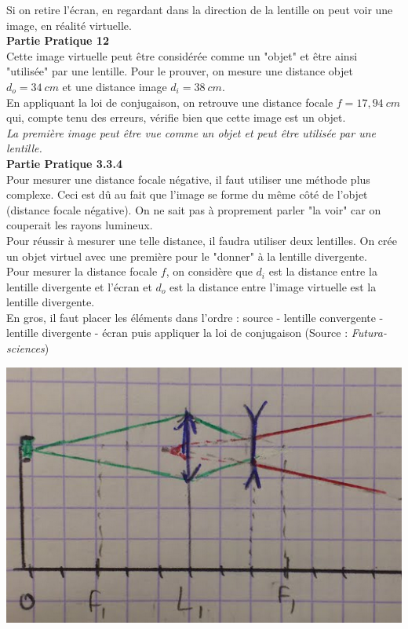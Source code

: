 \documentclass	[11pt, a4paper, openany]{book}
\begin{document}
		Si on retire l'écran, en regardant dans la direction de la lentille on peut voir une image, en réalité virtuelle.\\
		
		\textbf{Partie Pratique 12}\\
		Cette image virtuelle peut être considérée comme un "objet" et être ainsi "utilisée" par une lentille. Pour le prouver, on mesure une distance objet $d_o = 34\ cm$ et une distance image $d_i = 38\ cm$.\\
		En appliquant la loi de conjugaison, on retrouve une distance focale $f = 17,94\ cm$ qui, compte tenu des erreurs, vérifie bien que cette image est un objet.\\
		\textit{La première image peut être vue comme un objet et peut être utilisée  par une lentille.}\\
		
		\textbf{Partie Pratique 3.3.4}\\
		Pour mesurer une distance focale négative, il faut utiliser une méthode plus complexe. Ceci est dû au fait que l'image se forme du même côté de l'objet (distance focale négative). On ne sait pas à proprement parler "la voir" car on couperait les rayons lumineux.\\
		Pour réussir à mesurer une telle distance, il faudra utiliser deux lentilles. On crée un objet virtuel avec une première pour le "donner" à la lentille divergente.\\
		
		Pour mesurer la distance focale $f$, on considère que $d_i$ est la distance entre la lentille divergente et l'écran et $d_o$ est la distance entre  l'image virtuelle est la lentille divergente.\\
		
		En gros, il faut placer les éléments dans l'ordre : source - lentille convergente - lentille divergente - écran puis appliquer la loi de conjugaison (Source : \textit{Futura-sciences})
		\begin{center}
			\includegraphics[scale=0.5]{labo/image33.png}
		\end{center}
		
\end{document}
